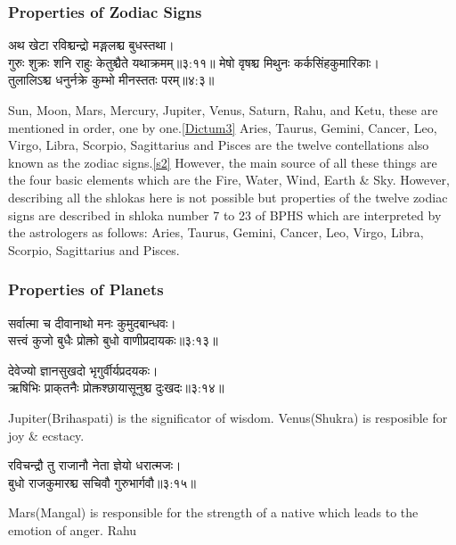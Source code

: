\subsubsection{Properties of Zodiac Signs}
\begin{sanskrit}
	\begin{center}
		अथ खेटा रविश्चन्द्रो मङ्गलश्च बुधस्तथा।\\गुरुः शुक्रः शनि राहुः केतुश्चैते यथाक्रमम्‌॥३:११॥\cite{BrihatParasharHoraShastraVol1, wiki:bphs}\label{Dictum3}
		मेषो वृषश्च मिथुनः कर्कसिंहकुमारिकाः।\\तुलालिऽश्च धनुर्नक्रे कुम्भो मीनस्ततः परम्‌॥४:३॥\cite{BrihatParasharHoraShastraVol1, wiki:bphs}\label{s2}
	\end{center}
\end{sanskrit}
Sun, Moon, Mars, Mercury, Jupiter, Venus, Saturn, Rahu, and Ketu, these are mentioned in order, one by one.\ref{Dictum3}
Aries, Taurus, Gemini, Cancer, Leo, Virgo, Libra, Scorpio, Sagittarius and Pisces are the twelve contellations also known as the zodiac signs.\ref{s2}
However, the main source of all these things are the four basic elements which are the Fire, Water, Wind, Earth \& Sky.
However, describing all the shlokas here is not possible but properties of the twelve zodiac signs are described in shloka number 7 to 23 of BPHS\cite{BrihatParasharHoraShastraVol1, wiki:bphs} which are interpreted by the astrologers as follows:
Aries, Taurus, Gemini, Cancer, Leo, Virgo, Libra, Scorpio, Sagittarius and Pisces.

\subsubsection{Properties of Planets}
\begin{sanskrit}
	\begin{center}
		सर्वात्मा च दीवानाथो मनः कुमुदबान्धवः।\\सत्त्वं कुजो बुधैः प्रोक्तो बुधो वाणीप्रदायकः॥३:१३॥\cite{BrihatParasharHoraShastraVol1, wiki:bphs}
	\end{center}
\end{sanskrit}
\begin{sanskrit}
	\begin{center}
		देवेज्यो ज्ञानसुखदो भृगुर्वीर्यप्रदयकः।\\ऋषिभिः प्राक्‌तनैः प्रोक्तश्छायासूनुश्च दुःखदः॥३:१४॥\cite{BrihatParasharHoraShastraVol1, wiki:bphs}
	\end{center}
\end{sanskrit}
Jupiter(Brihaspati) is the significator of wisdom. 
Venus(Shukra) is resposible for joy \& ecstacy.
\begin{sanskrit}
	\begin{center}
		रविचन्द्रौ तु राजानौ नेता ज्ञेयो धरात्मजः।\\बुधो राजकुमारश्च सचिवौ गुरुभार्गवौ॥३:१५॥\cite{BrihatParasharHoraShastraVol1, wiki:bphs}
	\end{center}
\end{sanskrit}
Mars(Mangal) is responsible for the strength of a native which leads to the emotion of anger.
Rahu

